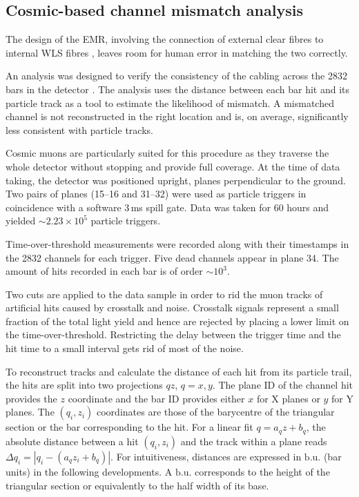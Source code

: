 \documentclass[a4paper,11pt]{article}
\begin{document}
\subsection{Cosmic-based channel mismatch analysis}\label{sec:ch_mismatch}

The design of the EMR, involving the connection of external clear fibres to internal WLS fibres \cite{emr_design_change}, leaves room for human error in matching the two correctly.

An analysis was designed to verify the consistency of the cabling across the 2832 bars in the detector \cite{emr_xt, Francois}. The analysis uses the distance between each bar hit and its particle track as a tool to estimate the likelihood of mismatch. A mismatched channel is not reconstructed in the right location and is, on average, significantly less consistent with particle tracks.

Cosmic muons are particularly suited for this procedure as they traverse the whole detector without stopping and provide full coverage. At the time of data taking, the detector was positioned upright, planes perpendicular to the ground. Two pairs of planes (15--16 and 31--32) were used as particle triggers in coincidence with a software 3\,ms spill gate. Data was taken for 60 hours and yielded $\sim2.23\times10^5$ particle triggers.

Time-over-threshold measurements were recorded along with their timestamps in the 2832 channels for each trigger. Five dead channels appear in plane 34. The amount of hits recorded in each bar is of order $\sim10^3$.

Two cuts are applied to the data sample in order to rid the muon tracks of artificial hits caused by crosstalk and noise. Crosstalk signals represent a small fraction of the total light yield and hence are rejected by placing a lower limit on the time-over-threshold. Restricting the delay between the trigger time and the hit time to a small interval gets rid of most of the noise.

To reconstruct tracks and calculate the distance of each hit from its particle trail, the hits are split into two projections $qz$, $q=x,y$. The plane ID of the channel hit provides the $z$ coordinate and the bar ID provides either $x$ for X planes or $y$ for Y planes. The $(q_i,z_i)$ coordinates are those of the barycentre of the triangular section or the bar corresponding to the hit. For a linear fit $q=a_qz+b_q$, the absolute distance between a hit $(q_i,z_i)$ and the track within a plane reads $\Delta q_i=|q_i-(a_qz_i+b_q)|$. For intuitiveness, distances are expressed in $\mathrm{b.u.}$ (bar units) in the following developments. A $\mathrm{b.u.}$ corresponds to the height of the triangular section or equivalently to the half width of its base.
\end{document}
